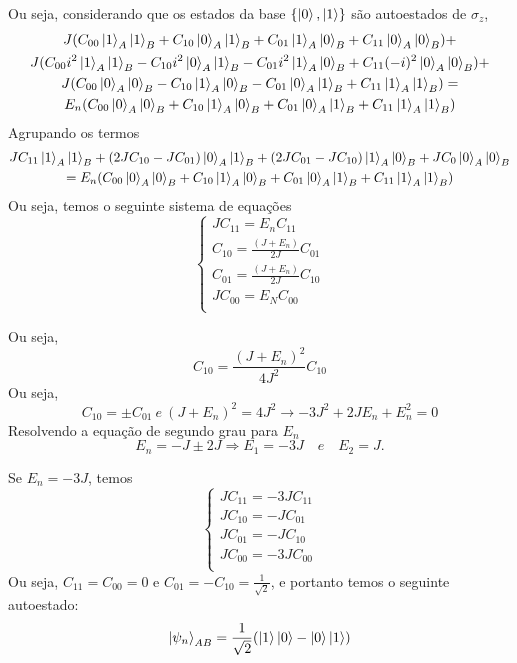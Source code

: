 \documentclass[
12pt,				%
openright,			%
oneside,			%
a4paper,			%
english,			%
french,				%
spanish,			%
brazil				%
]{abntex2}
\begin{document}
Ou seja, considerando que os estados da base $\{\ket{0},\ket{1}\}$ são autoestados de $\sigma_z$,
\begin{multline}
	J(C_{00} \ket{1}_A\ket{1}_B+ C_{10} \ket{0}_A\ket{1}_B +C_{01}\ket{1}_A\ket{0}_B+C_{11} \ket{0}_A\ket{0}_B) + \\
	J(C_{00} i^2 \ket{1}_A\ket{1}_B -C_{10} i^2 \ket{0}_A\ket{1}_B -C_{01}i^2\ket{1}_A\ket{0}_B+C_{11}(-i)^2\ket{0}_A\ket{0}_B) + \\
	J(C_{00} \ket{0}_A\ket{0}_B- C_{10} \ket{1}_A\ket{0}_B -C_{01}\ket{0}_A\ket{1}_B+C_{11} \ket{1}_A\ket{1}_B) = \\
	E_n(C_{00} \ket{0}_A\ket{0}_B+ C_{10} \ket{1}_A\ket{0}_B +C_{01}\ket{0}_A\ket{1}_B+C_{11} \ket{1}_A\ket{1}_B)
\end{multline}
 	Agrupando os termos 
 	 	\begin{multline}
 		JC_{11}\ket{1}_A\ket{1}_B + (2J C_{10} -JC_{01})\ket{0}_A\ket{1}_B + (2J C_{01} -JC_{10})\ket{1}_A\ket{0}_B +  JC_{0}\ket{0}_A\ket{0}_B \\= E_n(C_{00} \ket{0}_A\ket{0}_B+ C_{10} \ket{1}_A\ket{0}_B +C_{01}\ket{0}_A\ket{1}_B+C_{11} \ket{1}_A\ket{1}_B)
 	\end{multline}
 	Ou seja, temos o seguinte sistema de equações 
\begin{equation}
    \begin{cases}
		JC_{11} = E_nC_{11}\\
		C_{10} =\frac{(J +E_n)}{2J}C_{01}\\
		C_{01} =\frac{(J +E_n)}{2J}C_{10}\\
		JC_{00}= E_NC_{00}\\
	\end{cases}
\end{equation}

Ou seja, 
\begin{equation}
C_{10} =\frac{(J +E_n)^2}{4J^2}C_{10}	
\end{equation}
Ou seja,
\begin{equation}
C_{10} = \pm  C_{01}~e~(J +E_n)^2=4J^2  \rightarrow -3J^2 +2JE_n +E_n^2 =0
\end{equation}
Resolvendo a equação de segundo grau para $E_n$
\begin{equation}
	E_n= -J \pm 2J  \Rightarrow  E_1= -3J\quad e \quad E_2=J.
\end{equation}

Se $E_n=-3J$, temos 
\begin{equation}
	\begin{cases}
	JC_{11} = -3JC_{11}\\
	JC_{10} = -JC_{01}\\
    JC_{01} =-JC_{10}\\
	JC_{00}= -3JC_{00}\\
  \end{cases}
\end{equation}
Ou seja, $C_{11}=C_{00}=0$ e $C_{01} =-C_{10}=\frac{1}{\sqrt{2}}$, e portanto temos o seguinte autoestado:
\begin{equation}
	\ket{\psi_n}_{AB}= \frac{1}{\sqrt{2}}(\ket{1}\ket{0}- \ket{0}\ket{1})   
\end{equation}  
\end{document}
